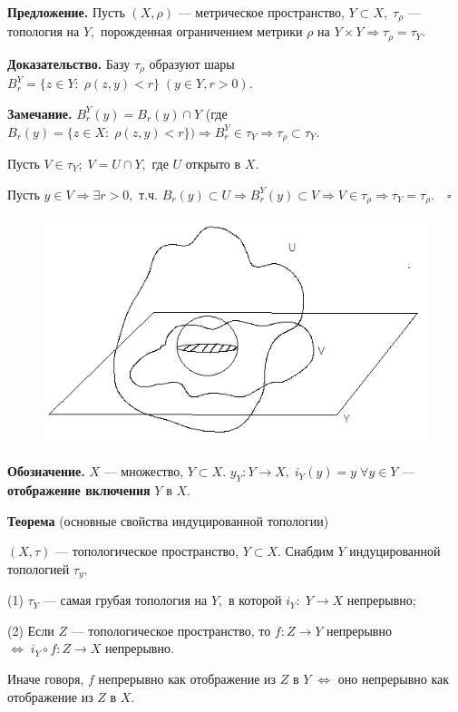 \documentclass[12pt,a4paper]{article}
\begin{document}
\textbf{Предложение.} Пусть $(X, \rho)$ --- метрическое пространство, $Y \subset X, \; \tau_{\rho}$ --- топология на $Y,$ порожденная ограничением метрики $\rho$ на $Y \times Y \Rightarrow \tau_{\rho} = \tau_{Y}.$ 

\textbf{Доказательство.} Базу $\tau_{\rho}$ образуют шары $B_{r}^{Y} = \{z \in Y: \; \rho(z, y) < r\} \; (y \in Y, r > 0).$ 

\textbf{Замечание.} $B_{r}^{Y}(y) = B_{r}(y) \cap Y$ (где $B_{r}(y) = \{z \in X: \; \rho(z, y) < r\}) \Rightarrow B_{r}^{Y} \in \tau_{Y} \Rightarrow \tau_{\rho} \subset \tau_{Y}.$ 

Пусть $V \in \tau_{Y}; \; V = U \cap Y,$ где $U$ открыто в $X.$ 

Пусть $y \in V \Rightarrow \exists r > 0,$ т.ч. $B_{r}(y) \subset U \Rightarrow B_{r}^{Y}(y) \subset V \Rightarrow V \in \tau_{\rho} \Rightarrow \tau_{Y} = \tau_{\rho}. \quad \square$ 

\begin{figure}[htpb]
	\centering
	\includegraphics[width=0.6\linewidth]{lect5_4.png}
\end{figure}

\textbf{Обозначение.} $X$ --- множество, $Y \subset X.$ $y_{Y}: Y \to X, \; i_{Y}(y) = y \; \forall y \in Y$ --- \textbf{отображение включения} $Y$ в $X.$ 

\textbf{Теорема} (основные свойства индуцированной топологии)

$(X, \tau)$ --- топологическое пространство, $Y \subset X.$ Снабдим $Y$ индуцированной топологией $\tau_{y}.$ 

(1) $\tau_{Y}$ --- самая грубая топология на $Y,$ в которой $i_{Y}: \; Y \to X$ непрерывно;

(2) Если $Z$ --- топологическое пространство, то $f: Z \to Y$ непрерывно $\Leftrightarrow \; i_{Y} \circ f: Z \to X$ непрерывно. 

Иначе говоря, $f$ непрерывно как отображение из $Z$ в $Y \; \Leftrightarrow$ оно непрерывно как отображение из $Z$ в $X.$ 
\end{document}
